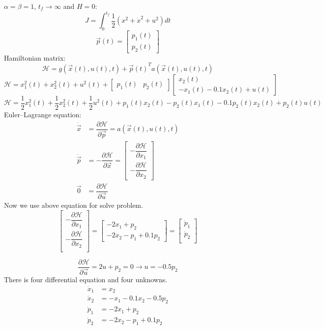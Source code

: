 $\alpha = \beta = 1$, $t_f\to \infty $ and $H = 0$:
$$J =  \int_0^{t_f} \dfrac 12(x^2 + \dot x^2 + u^2)dt$$
$$\vec{p}(t) = \begin{bmatrix}
	p_1(t) \\
	p_2(t)
\end{bmatrix} $$
Hamiltonian matrix:
$$\mathcal{H} =  g(\vec x(t), u(t), t) + {\vec{p}(t)}^Ta(\vec x(t), u(t), t)$$
$$
\mathcal{H} = 
x_1^2(t) +  x_2^2(t) + u^2(t)  +
 \begin{bmatrix}
	p_1(t) & p_2(t)
\end{bmatrix}  \begin{bmatrix}
	x_2(t)\\
	-x_1(t)- 0.1x_2(t) + u(t) 
\end{bmatrix} 
$$
$$
\mathcal{H} = 
\dfrac 12 x_1^2(t) + \dfrac 12 x_2^2(t) + \dfrac 12 u^2(t) + 
p_1(t)x_2(t) -p_2(t)x_1(t)- 0.1p_2(t)x_2(t)+p_2(t)u(t)
$$
Euler–Lagrange equation:
\begin{align}
\dot{\vec{x}} &= \dfrac{\partial \mathcal{H} }{\partial \vec{p}} = a(\vec x(t), u(t), t)\\
\dot{\vec{p}} &= -\dfrac{\partial \mathcal{H} }{\partial \vec{x}} =  \begin{bmatrix}
	-\dfrac{\partial \mathcal{H} }{\partial x_1}\\[10pt]
	-\dfrac{\partial \mathcal{H} }{\partial x_2}
\end{bmatrix} \\
\vec{0} &= \dfrac{\partial \mathcal{H} }{\partial \vec{u}}
\end{align}
Now we use above equation for solve problem.
$$
\begin{bmatrix}
	-\dfrac{\partial \mathcal{H} }{\partial x_1}\\[10pt]
	-\dfrac{\partial \mathcal{H} }{\partial x_2}\\
\end{bmatrix}  = 
\begin{bmatrix}
	-2x_1+p_2\\
	-2x_2-p_1 +0.1p_2
\end{bmatrix} 
= 
\begin{bmatrix}
	\dot p_1\\
	\dot p_2\\
\end{bmatrix} 
$$

$$
\dfrac{\partial \mathcal{H} }{\partial \vec{u}} = 2u+p_2 = 0 \to u = -0.5p_2
$$
There is four differential equation and four unknowns.
\begin{align}
\dot x_1 &= x_2\\
\dot x_2 &= -x_1- 0.1x_2 - 0.5p_2 \\
\dot p_1 &= -2x_1+p_2\\
\dot p_2 &= -2x_2-p_1 +0.1p_2
\end{align}


